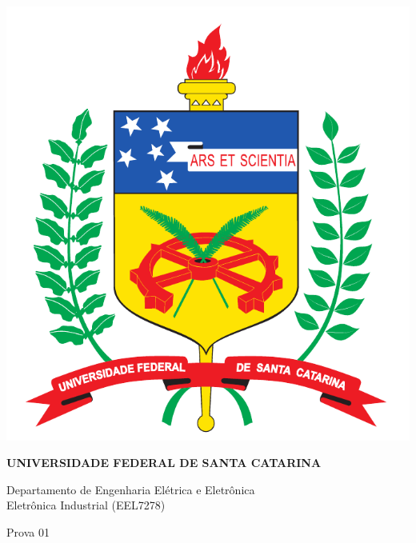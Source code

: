 \documentclass[11pt,paper=a4,answers]{exam}
\begin{document}
	
	\noindent
	\begin{minipage}[l]{.1\textwidth}%
		\noindent
		\includegraphics[width=2\textwidth]{logo-ufsc}
	\end{minipage}
	\hfill
	\begin{minipage}[r]{.8\textwidth}%
		\begin{center}
			{\large \bfseries UNIVERSIDADE FEDERAL DE SANTA CATARINA \par
				\large Departamento de Engenharia Elétrica e Eletrônica \\[4pt]
				Eletrônica Industrial {(EEL7278)}  \par
				\vspace{0.5cm}
				\huge Prova 01
				}
		\end{center}
	\end{minipage}	
		
		\par
		\noindent
		\uline
	\hfill 	
			
\end{document}
